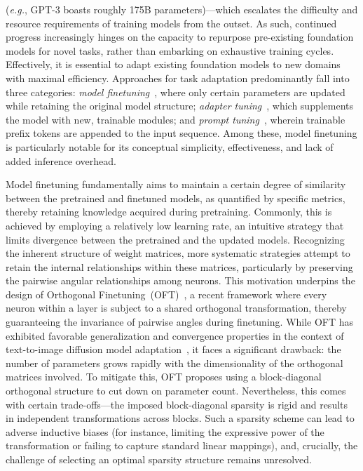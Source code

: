 (\emph{e.g.}, GPT-3 boasts roughly 175B parameters)—which escalates the difficulty and resource requirements of training models from the outset. As such, continued progress increasingly hinges on the capacity to repurpose pre-existing foundation models for novel tasks, rather than embarking on exhaustive training cycles. Effectively, it is essential to adapt existing foundation models to new domains with maximal efficiency. Approaches for task adaptation predominantly fall into three categories: \emph{model finetuning}~\cite{hulora2022,zaken2022bitfit,guo2020parameter,raffel2020exploring,qiu2023controlling,zhang2022adaptive,chavan2023one}, where only certain parameters are updated while retaining the original model structure; \emph{adapter tuning}~\cite{rebuffi2017learning,houlsby2019parameter,pfeiffer2020adapterfusion,lin2020exploring,he2021towards}, which supplements the model with new, trainable modules; and \emph{prompt tuning}~\cite{li2021prefix,lester2021power}, wherein trainable prefix tokens are appended to the input sequence. Among these, model finetuning is particularly notable for its conceptual simplicity, effectiveness, and lack of added inference overhead.

Model finetuning fundamentally aims to maintain a certain degree of similarity between the pretrained and finetuned models, as quantified by specific metrics, thereby retaining knowledge acquired during pretraining. Commonly, this is achieved by employing a relatively low learning rate, an intuitive strategy that limits divergence between the pretrained and the updated models. Recognizing the inherent structure of weight matrices, more systematic strategies attempt to retain the internal relationships within these matrices, particularly by preserving the pairwise angular relationships among neurons. This motivation underpins the design of Orthogonal Finetuning~(OFT)~\cite{qiu2023controlling}, a recent framework where every neuron within a layer is subject to a shared orthogonal transformation, thereby guaranteeing the invariance of pairwise angles during finetuning. While OFT has exhibited favorable generalization and convergence properties in the context of text-to-image diffusion model adaptation~\cite{qiu2023controlling}, it faces a significant drawback: the number of parameters grows rapidly with the dimensionality of the orthogonal matrices involved. To mitigate this, OFT proposes using a block-diagonal orthogonal structure to cut down on parameter count. Nevertheless, this comes with certain trade-offs—the imposed block-diagonal sparsity is rigid and results in independent transformations across blocks. Such a sparsity scheme can lead to adverse inductive biases (for instance, limiting the expressive power of the transformation or failing to capture standard linear mappings), and, crucially, the challenge of selecting an optimal sparsity structure remains unresolved.

